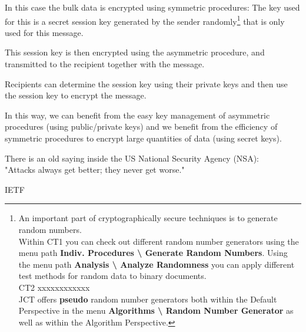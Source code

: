 In this case the bulk data is encrypted using symmetric procedures: The key
used for this is a secret session key generated by the
sender randomly\footnote{%
   An important part of cryptographically secure techniques is to generate 
   random numbers.\\
   Within CT1 you can check out
   different random number generators using the menu path
   {\bf Indiv. Procedures \textbackslash{} Generate Random Numbers}. 
   Using the menu path {\bf Analysis \textbackslash{} Analyze Randomness}
   you can apply different test methods for random data to binary documents. \\
   CT2 xxxxxxxxxxxx\\
   JCT offers {\bf pseudo} random number generators both
   within the Default Perspective in the menu {\bf Algorithms \textbackslash{}
   Random Number Generator} as well as within the Algorithm Perspective.
}
that is only used for this message.

This session key is then encrypted using the asymmetric procedure, and
transmitted to the recipient together with the message.

Recipients can determine the session key using their private keys and
then use the session key to encrypt the message.

In this way, we can benefit from the easy key management
of asymmetric procedures (using public/private keys) and we benefit from the
efficiency of symmetric procedures to encrypt large quantities of data
(using secret keys).



\newpage

\begin{ctsquote}
    There is an old saying inside the US National Security Agency (NSA):\\
    "Attacks always get better; they never get worse."
\caption[IETF]{IETF\footnotemark}
\end{ctsquote}
\addtocounter{footnote}{0}

